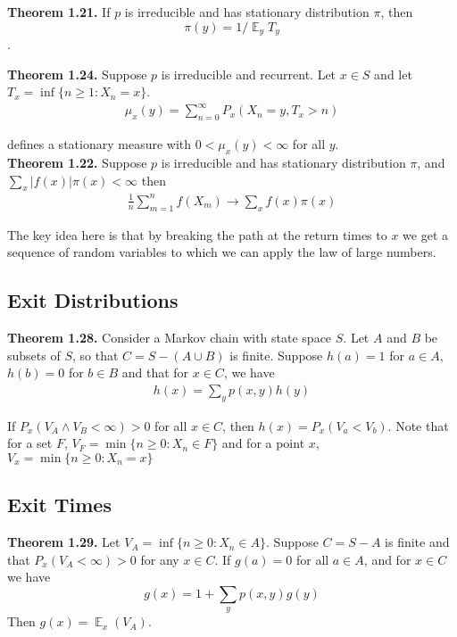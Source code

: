 \documentclass[12pt]{article}
\DeclareMathOperator*{\E}{\mathbb{E}}
\begin{document}
\textbf{Theorem 1.21.} If $p$ is irreducible and has stationary distribution $\pi$, then $$\pi(y) = 1/\E_y T_y$$.

\textbf{Theorem 1.24.} Suppose $p$ is irreducible and recurrent. Let $x \in S$ and let $T_x = \inf \{n \geq 1: X_n = x\}$.
\begin{align*}
\mu_x(y) = \sum_{n=0}^{\infty} P_x(X_n = y, T_x > n)
\end{align*}

defines a stationary measure with $0 < \mu_x(y) < \infty$ for all $y$.\\

\textbf{Theorem 1.22.} Suppose $p$ is irreducible and has stationary distribution $\pi$, and $\sum_x |f(x)| \pi(x) < \infty$ then
\begin{align*}
\frac{1}{n} \sum_{m=1}^n f(X_m) \to \sum_x f(x) \pi(x)
\end{align*}

The key idea here is that by breaking the path at the return times to $x$ we get a sequence of random variables to which we can apply the law of large numbers.

\subsection{Exit Distributions}

\textbf{Theorem 1.28.} Consider a Markov chain with state space $S$. Let $A$ and $B$ be subsets of $S$, so that $C = S - (A \cup B)$ is finite. Suppose $h(a) = 1$ for $a \in A$, $h(b) = 0$ for $b \in B$ and that for $x \in C$, we have
\begin{align*}
h(x) = \sum_y p(x,y)h(y)
\end{align*}

If $P_x(V_A \wedge V_B < \infty) > 0$ for all $x \in C$, then $h(x) = P_x(V_a < V_b)$. Note that for a set $F$, $V_F = \min\{n \geq 0: X_n \in F\}$ and for a point $x$, $V_x = \min\{n \geq 0: X_n = x\}$


\subsection{Exit Times}

\textbf{Theorem 1.29.} Let $V_A = \inf\{n \geq 0: X_n \in A\}$. Suppose $C = S - A$ is finite and that $P_x(V_A < \infty) > 0$ for any $x \in C$. If $g(a) = 0$ for all $a \in A$, and for $x \in C$ we  have $$g(x) = 1 + \sum_y p(x, y)g(y)$$ Then $g(x) = \E_x(V_A)$.
\end{document}
